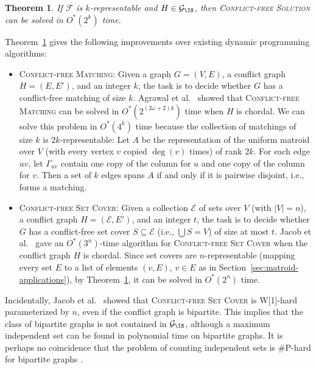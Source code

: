 \documentclass[10pt,a4paper]{article}
\newtheorem{theorem}{Theorem}[section]
\newcommand{\cE}{\ensuremath{\mathcal E}\xspace}
\newcommand{\cF}{\ensuremath{\mathcal F}\xspace}
\begin{document}
\begin{theorem} \label{theorem:conflict-free}
  If $\cF$ is $k$-representable and $H \in \mathcal{G}_{\IS}$, then 
  \textsc{Conflict-free Solution} can be solved in $O^*(2^{k})$ time.
\end{theorem}

Theorem~\ref{theorem:conflict-free} gives the following improvements over existing dynamic programming algorithms:
\begin{itemize}
  \item
  \textsc{Conflict-free Matching}: Given a graph $G = (V, E)$, a conflict graph $H = (E, E')$, and an integer $k$, the task is to decide whether $G$ has a conflict-free matching of size $k$.
  Agrawal et al.~\cite{AgrawalJKS20} showed that \textsc{Conflict-free Matching} can be solved in $O^*(2^{(2\omega + 2)k})$ time when $H$ is chordal.
  We can solve this problem in $O^*(4^k)$ time because the collection of matchings of size $k$ is $2k$-representable:
  Let $A$ be the representation of the uniform matroid over $V$ (with every vertex $v$ copied $\deg(v)$ times) of rank $2k$.
  For each edge $uv$, let $\Gamma_{uv}$ contain one copy of the column for $u$ and one copy of the column for $v$.
  Then a set of $k$ edges spans $A$ if and only if it is pairwise disjoint, i.e., forms a matching.
  \item
  \textsc{Conflict-free Set Cover}: Given a collection $\cE$ of sets over $V$ (with $|V| = n$), a conflict graph $H = (\cE, E')$, and an integer $t$, the task is to decide whether $G$ has a conflict-free set cover $S \subseteq \cE$ (i.e., $\bigcup S = V$) of size at most $t$.
  Jacob et al.~\cite{JacobMR21} gave an $O^*(3^n)$-time algorithm for \textsc{Conflict-free Set Cover} when the conflict graph $H$ is chordal.
  Since set covers are $n$-representable (mapping every set $E$ to a list of elements $(v,E)$, $v \in E$ as in Section~\ref{sec:matroid-applications}),
  by Theorem~\ref{theorem:conflict-free}, it can be solved in $O^*(2^n)$ time.
\end{itemize}

Incidentally, Jacob et al.~\cite{JacobMR21} showed that \textsc{Conflict-free Set Cover} is W[1]-hard parameterized by $n$, even if the conflict graph is bipartite.
This implies that the class of bipartite graphs is not contained in $\mathcal{G}_{\IS}$, although a maximum independent set can be found in polynomial time on bipartite graphs.
It is perhaps no coincidence that the problem of counting independent sets is \#P-hard for bipartite graphs \cite{ProvanB83}.
\end{document}
